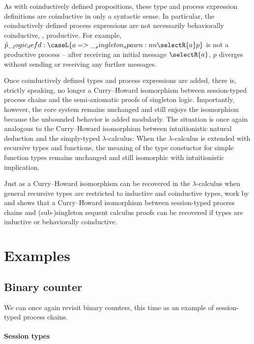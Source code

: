 As with coinductively defined propositions, these type and process expression definitions are coinductive in only a syntactic sense.
In particular, the coinductively defined process expressions are not necessarily behaviorally coinductive, \ie, productive.
For example, $\defp{p} \defd \caseL{a => \spawn{\selectR{a}}{p}}$ is not a productive process -- after receiving an initial message $\selectR{a}$, $p$ diverges without sending or receiving any further messages.

Once coinductively defined types and process expressions are added, there is, strictly speaking, no longer a Curry--Howard isomorphism between session-typed process chains and the semi-axiomatic proofs of singleton logic.
Importantly, however, the core system remains unchanged and still enjoys the isomorphism because the unbounded behavior is added modularly.
The situation is once again analogous to the Curry--Howard isomorphism between intuitionistic natural deduction and the simply-typed $\lambda$-calculus:
When the $\lambda$-calculus is extended with recursive types and functions, the meaning of the type constuctor for simple function types remains unchanged and still isomorphic with intuitionistic implication.

Just as a Curry--Howard isomorphism can be recovered in the $\lambda$-calculus when general recursive types are restricted to inductive and coinductive types, work by \textcite{Derakhshan+Pfenning:LMCS20} and \textcite{Somayyajula+Pfenning:20} shows that a Curry--Howard isomorphism between session-typed process chains and (sub-)singleton sequent calculus proofs can be recovered if types are inductive or behaviorally coinductive.


\section{Examples}

\subsection{Binary counter}\label{sec:process-chains:binary-counter}

We can once again revisit binary counters, this time as an example of session-typed process chains.

\paragraph*{Session types}

